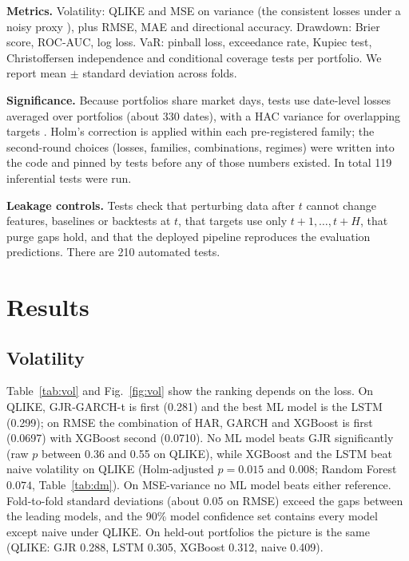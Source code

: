 \documentclass[conference,a4paper]{IEEEtran}
\begin{document}
\textbf{Metrics.} Volatility: QLIKE and MSE on variance (the consistent losses under a noisy proxy
\cite{patton2011}), plus RMSE, MAE and directional accuracy. Drawdown: Brier score, ROC-AUC, log
loss. VaR: pinball loss, exceedance rate, Kupiec test, Christoffersen independence and conditional
coverage tests per portfolio. We report mean $\pm$ standard deviation across folds.

\textbf{Significance.} Because portfolios share market days, tests use date-level losses averaged
over portfolios (about 330 dates), with a HAC variance for overlapping targets
\cite{dm1995,hln1997}. Holm's correction is applied within each pre-registered family; the
second-round choices (losses, families, combinations, regimes) were written into the code and pinned
by tests before any of those numbers existed. In total 119 inferential tests were run.

\textbf{Leakage controls.} Tests check that perturbing data after $t$ cannot change features,
baselines or backtests at $t$, that targets use only $t+1,\dots,t+H$, that purge gaps hold, and that
the deployed pipeline reproduces the evaluation predictions. There are 210 automated tests.

\section{Results}
\subsection{Volatility}
Table~\ref{tab:vol} and Fig.~\ref{fig:vol} show the ranking depends on the loss. On QLIKE,
GJR-GARCH-t is first (0.281) and the best ML model is the LSTM (0.299); on RMSE the combination of
HAR, GARCH and XGBoost is first (0.0697) with XGBoost second (0.0710). No ML model beats GJR
significantly (raw $p$ between 0.36 and 0.55 on QLIKE), while XGBoost and the LSTM beat naive
volatility on QLIKE (Holm-adjusted $p=0.015$ and $0.008$; Random Forest $0.074$,
Table~\ref{tab:dm}). On MSE-variance no ML model beats either reference. Fold-to-fold standard
deviations (about 0.05 on RMSE) exceed the gaps between the leading models, and the 90\% model
confidence set contains every model except naive under QLIKE. On held-out portfolios the picture is
the same (QLIKE: GJR 0.288, LSTM 0.305, XGBoost 0.312, naive 0.409).

\begin{table}[t]
\centering\small
\caption{Volatility forecasts, mean over six test years (lower is better except accuracy).}
\label{tab:vol}
\resizebox{\columnwidth}{!}{}
\end{table}
\end{document}
